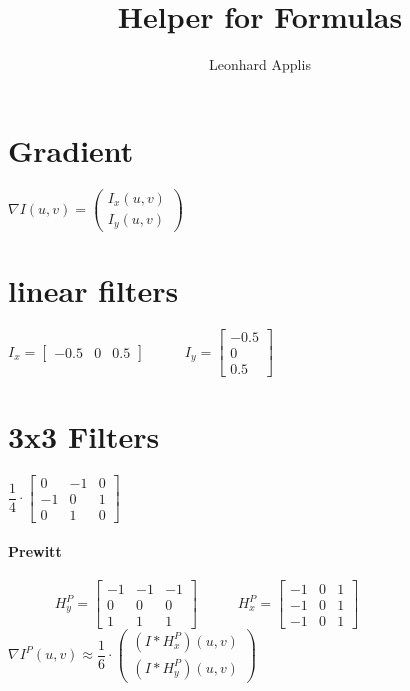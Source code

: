 \documentclass[10pt,a4paper]{report}
\author{Leonhard Applis}
\title{Helper for Formulas}
\begin{document}
	\section{Gradient}
	$\nabla I(u,v) =  \begin{pmatrix}
	I_x(u,v) \\ I_y(u,v)
	\end{pmatrix}$

	\section{linear filters}
	$I_x = \begin{bmatrix}
	-0.5 & 0 & 0.5
	\end{bmatrix}$
	~\newline
	~\newline
	~\newline
	$I_y = \begin{bmatrix}
	-0.5 \\ 0 \\ 0.5
	\end{bmatrix}$
	~\newline
	\section{3x3 Filters}
	$\dfrac{1}{4} \cdot \begin{bmatrix}
	0 & -1 & 0 \\ -1 & 0 & 1 \\ 0 & 1 & 0
	\end{bmatrix} $
	~\newline
	~\newline
	~\newline
	\paragraph{Prewitt} ~\newline
	~\newline
	~\newline
	~\newline
		$H^P_y = \begin{bmatrix}
	-1 & -1 & -1 \\ 0 & 0 & 0 \\ 1 & 1 & 1
	\end{bmatrix} $
	~\newline
	~\newline
	~\newline
		$H^P_x = \begin{bmatrix}
	-1 & 0 & 1 \\ -1 & 0 & 1 \\ -1 & 0 & 1
	\end{bmatrix} $
	~\newline
	~\newline
	~\newline
	$\nabla I^P(u,v)\approx \dfrac{1}{6} \cdot \begin{pmatrix}
	(I\ast H^P_x)(u,v) \\ (I\ast H^P_y)(u,v) 
	\end{pmatrix}$
\end{document}
